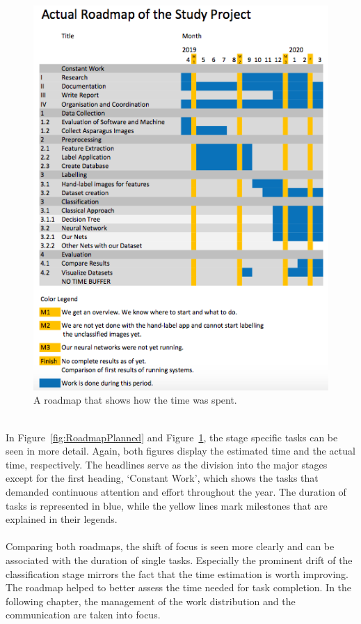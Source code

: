 \begin{figure}[h]
	\centering
	\includegraphics[scale=0.5]{Figures/chapter02/roadmap_actual}
	\decoRule
	\caption[Actual Roadmap]{A roadmap that shows how the time was spent.}
	\label{fig:RoadmapActual}
\end{figure}
\\
In Figure~\ref{fig:RoadmapPlanned} and Figure~\ref{fig:RoadmapActual}, the stage specific tasks can be seen in more detail. Again, both figures display the estimated time and the actual time, respectively. The headlines serve as the division into the major stages except for the first heading, ‘Constant Work’, which shows the tasks that demanded continuous attention and effort throughout the year. The duration of tasks is represented in blue, while the yellow lines mark milestones that are explained in their legends. \\
\\
Comparing both roadmaps, the shift of focus is seen more clearly and can be associated with the duration of single tasks. Especially the prominent drift of the classification stage mirrors the fact that the time estimation is worth improving. The roadmap helped to better assess the time needed for task completion.
In the following chapter, the management of the work distribution and the communication are taken into focus.


